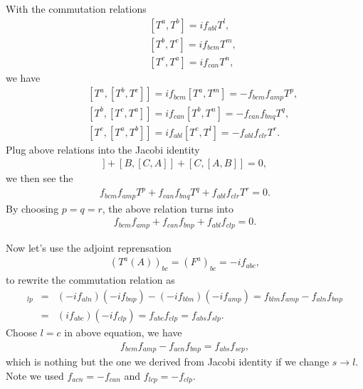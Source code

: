 \documentclass[11pt]{article}
\begin{document}
\section{ }
With the commutation relations
\begin{eqnarray}
    &&[T^a,T^b]=if_{abl}T^l, \\
    &&[T^b,T^c]=if_{bcm}T^m, \\
    &&[T^c,T^a]=if_{can}T^n, 
\end{eqnarray}
we have
\begin{eqnarray}
  &&[T^a,[T^b,T^c]]= if_{bcm}[T^a,T^m]=-f_{bcm}f_{amp}T^p, \\
  &&[T^b,[T^c,T^a]]= if_{can}[T^b,T^n]=-f_{can}f_{bnq}T^q, \\
  &&[T^c,[T^a,T^b]]= if_{abl}[T^c,T^l]=-f_{abl}f_{clr}T^r.
\end{eqnarray}
Plug above relations into the Jacobi identity
\begin{eqnarray}
  [A,[B,C]] + [B,[C,A]] + [C,[A,B]] = 0,
\end{eqnarray}
we then see the
\begin{eqnarray}
    f_{bcm}f_{amp}T^p+f_{can}f_{bnq}T^q+f_{abl}f_{clr}T^r=0.
\end{eqnarray}
By choosing $p=q=r$, the above relation turns into
\begin{eqnarray}
    f_{bcm}f_{amp}+f_{can}f_{bnp}+f_{abl}f_{clp}=0.
\end{eqnarray}

Now let's use the adjoint reprensation
\begin{eqnarray}
    (T^a(A))_{bc} = (F^a)_{bc} = -i f_{abc},
\end{eqnarray}
to rewrite the commutation relation as
\begin{eqnarray}
    [T^a,T^b]_{lp}&=&(-if_{aln})(-if_{bnp})-(-if_{blm})(-if_{amp})=f_{blm}f_{amp}-f_{aln}f_{bnp} \\ 
    &=&(if_{abc})(-if_{clp})=f_{abc}f_{clp}=f_{abs}f_{slp}.
\end{eqnarray}
Choose $l=c$ in above equation, we have
\begin{eqnarray}
    f_{bcm}f_{amp}-f_{acn}f_{bnp}=f_{abs}f_{scp},
\end{eqnarray}
which is nothing but the one we derived from Jacobi identity if we change $s\to l$. Note we used $f_{acn}=-f_{can}$ and $f_{lcp}=-f_{clp}$.
\end{document}
